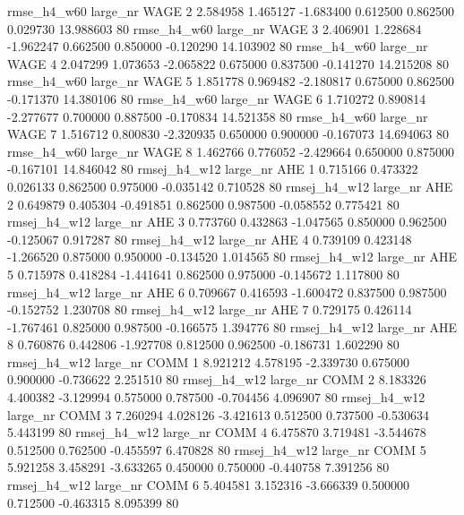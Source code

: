  rmse_h4_w60   large_nr     WAGE                 2  2.584958  1.465127  -1.683400 0.612500 0.862500  0.029730   13.988603 80
 rmse_h4_w60   large_nr     WAGE                 3  2.406901  1.228684  -1.962247 0.662500 0.850000 -0.120290   14.103902 80
 rmse_h4_w60   large_nr     WAGE                 4  2.047299  1.073653  -2.065822 0.675000 0.837500 -0.141270   14.215208 80
 rmse_h4_w60   large_nr     WAGE                 5  1.851778  0.969482  -2.180817 0.675000 0.862500 -0.171370   14.380106 80
 rmse_h4_w60   large_nr     WAGE                 6  1.710272  0.890814  -2.277677 0.700000 0.887500 -0.170834   14.521358 80
 rmse_h4_w60   large_nr     WAGE                 7  1.516712  0.800830  -2.320935 0.650000 0.900000 -0.167073   14.694063 80
 rmse_h4_w60   large_nr     WAGE                 8  1.462766  0.776052  -2.429664 0.650000 0.875000 -0.167101   14.846042 80
rmsej_h4_w12   large_nr      AHE                 1  0.715166  0.473322   0.026133 0.862500 0.975000 -0.035142    0.710528 80
rmsej_h4_w12   large_nr      AHE                 2  0.649879  0.405304  -0.491851 0.862500 0.987500 -0.058552    0.775421 80
rmsej_h4_w12   large_nr      AHE                 3  0.773760  0.432863  -1.047565 0.850000 0.962500 -0.125067    0.917287 80
rmsej_h4_w12   large_nr      AHE                 4  0.739109  0.423148  -1.266520 0.875000 0.950000 -0.134520    1.014565 80
rmsej_h4_w12   large_nr      AHE                 5  0.715978  0.418284  -1.441641 0.862500 0.975000 -0.145672    1.117800 80
rmsej_h4_w12   large_nr      AHE                 6  0.709667  0.416593  -1.600472 0.837500 0.987500 -0.152752    1.230708 80
rmsej_h4_w12   large_nr      AHE                 7  0.729175  0.426114  -1.767461 0.825000 0.987500 -0.166575    1.394776 80
rmsej_h4_w12   large_nr      AHE                 8  0.760876  0.442806  -1.927708 0.812500 0.962500 -0.186731    1.602290 80
rmsej_h4_w12   large_nr     COMM                 1  8.921212  4.578195  -2.339730 0.675000 0.900000 -0.736622    2.251510 80
rmsej_h4_w12   large_nr     COMM                 2  8.183326  4.400382  -3.129994 0.575000 0.787500 -0.704456    4.096907 80
rmsej_h4_w12   large_nr     COMM                 3  7.260294  4.028126  -3.421613 0.512500 0.737500 -0.530634    5.443199 80
rmsej_h4_w12   large_nr     COMM                 4  6.475870  3.719481  -3.544678 0.512500 0.762500 -0.455597    6.470828 80
rmsej_h4_w12   large_nr     COMM                 5  5.921258  3.458291  -3.633265 0.450000 0.750000 -0.440758    7.391256 80
rmsej_h4_w12   large_nr     COMM                 6  5.404581  3.152316  -3.666339 0.500000 0.712500 -0.463315    8.095399 80

